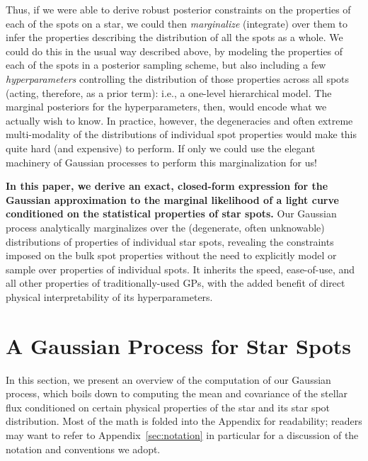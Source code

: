 \documentclass[modern]{aastex62}
\begin{document}
Thus, if we were able to derive robust posterior constraints
on the properties of each of the spots on a star, we could then
\emph{marginalize} (integrate) over them to infer the properties
describing the distribution of all the spots as a whole.
We could do this in the usual way described above, by
modeling the properties of each of the spots in a posterior sampling
scheme, but also including a few
\emph{hyperparameters} controlling the distribution of those properties
across all spots (acting, therefore, as a prior term): i.e., a one-level
hierarchical model. The marginal posteriors for the hyperparameters, then,
would encode what we actually wish to know.
%
In practice, however, the degeneracies and often extreme multi-modality
of the distributions of individual spot properties would make this
quite hard (and expensive) to perform.
%
If only we could use the elegant machinery of Gaussian processes to
perform this marginalization for us!

\textbf{In this paper, we derive an exact, closed-form expression for
    the Gaussian approximation to the marginal likelihood of a light curve
    conditioned on the statistical properties of star spots.} Our Gaussian
process analytically marginalizes over the (degenerate, often unknowable)
distributions of properties of individual star spots, revealing the
constraints imposed on the bulk spot properties without the need to
explicitly model or sample over properties of individual spots. It inherits
the speed, ease-of-use, and all other properties of traditionally-used
GPs, with the added benefit of direct physical interpretability of its
hyperparameters.
%



\section{A Gaussian Process for Star Spots}
\label{sec:main}

In this section, we present an overview of the computation of our Gaussian
process, which boils down to computing the mean and covariance of the stellar
flux conditioned on certain physical properties of the star and its star spot
distribution. Most of the math is folded into the Appendix for readability;
readers may want to refer to Appendix~\ref{sec:notation} in particular for
a discussion of the notation and conventions we adopt.
\end{document}
